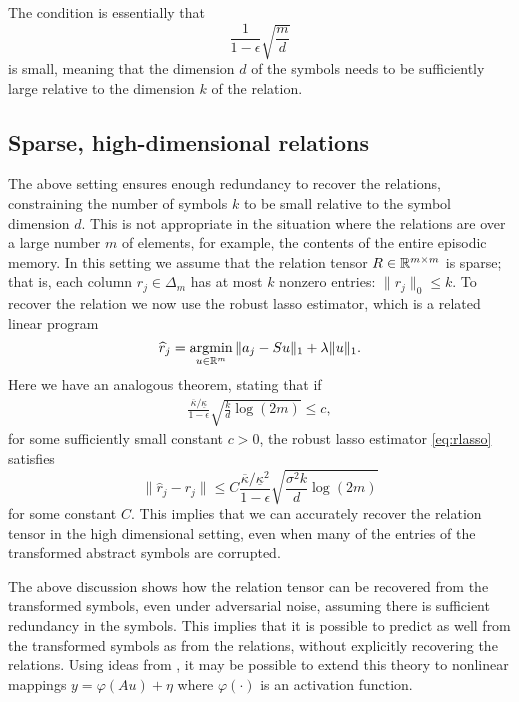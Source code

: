 The condition is essentially that
  \begin{equation}
    \frac{1}{1-\epsilon} \sqrt{\frac{m}{d}}
  \end{equation}
  is small, meaning that the dimension \(d\) of the symbols needs to be sufficiently large relative
  to the dimension \(k\) of the relation.

  \subsection{Sparse, high-dimensional relations}

 The above setting ensures enough redundancy to recover the relations, constraining the number of symbols \(k\) to be small relative to the symbol dimension \(d\). This is not appropriate in the situation where the relations are over a large number \(m\) of elements, for example, the contents of the entire episodic memory.
 In this setting we assume that the relation tensor \(R \in \mathbb{R}^{m\times m}\) is sparse; that is,
 each column \(r_j \in \Delta_m\) has at most \(k\) nonzero entries: \(\|r_j\|_0 \leq k\). To recover the relation
 we now use the robust lasso estimator, which is a related linear program
\begin{equation}
  \widehat r_j = \mathop{\rm argmin}_{u \in\mathbb{R}^m} \| a_j - S u\|_1 + \lambda\|u\|_1. \label{eq:rlasso}
\end{equation}
Here we have an analogous theorem, stating that if
\begin{eqnarray}
  \frac{\overline{\kappa}/\underline{\kappa}}{1-\epsilon}\sqrt{\frac{k}{d}\log(2m)}\leq c,
\end{eqnarray}
for some sufficiently small constant \(c>0\), the robust lasso estimator \eqref{eq:rlasso} satisfies
\begin{equation}
  \|\hat r_j - r_j\| \leq C \frac{\overline{\kappa}/\underline{\kappa}^2}{1-\epsilon} \sqrt{\frac{\sigma^2 k}{d} \log(2m)}
\end{equation}
for some constant \(C\).
This implies that we can accurately recover the relation tensor in the high dimensional setting, even when many of the entries of the transformed abstract symbols are corrupted.


The above discussion shows how the relation tensor can be recovered from the transformed symbols, even under adversarial noise, assuming there is sufficient redundancy in the symbols. This implies that it is possible to predict as well from the transformed symbols as from the relations, without explicitly recovering the relations.
Using ideas from \citep{surfing,HandV17}, it may be possible to extend this theory to nonlinear mappings
\(y = \varphi(Au) + \eta\) where \(\varphi(\cdot)\) is an activation function.

